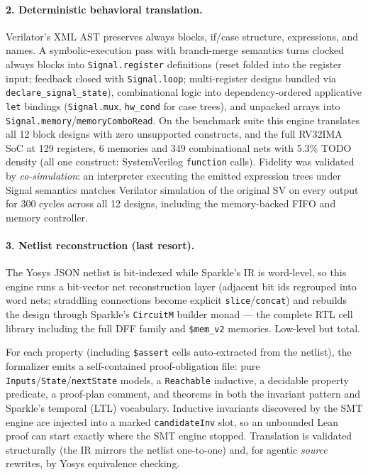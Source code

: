 \documentclass[11pt]{article}
\begin{document}
\paragraph{2. Deterministic behavioral translation.} Verilator's XML AST
preserves always blocks, if/case structure, expressions, and names. A
symbolic-execution pass with branch-merge semantics turns clocked always
blocks into \texttt{Signal.register} definitions (reset folded into the
register input; feedback closed with \texttt{Signal.loop}; multi-register
designs bundled via \texttt{declare\_signal\_state}), combinational logic
into dependency-ordered applicative \texttt{let} bindings
(\texttt{Signal.mux}, \texttt{hw\_cond} for case trees), and unpacked
arrays into \texttt{Signal.memory}/\texttt{memoryComboRead}. On the
benchmark suite this engine translates all 12 block designs with zero
unsupported constructs, and the full RV32IMA SoC at 129 registers, 6
memories and 349 combinational nets with 5.3\% TODO density (all one
construct: SystemVerilog \texttt{function} calls). Fidelity was validated
by \emph{co-simulation}: an interpreter executing the emitted expression
trees under Signal semantics matches Verilator simulation of the original
SV on every output for 300 cycles across all 12 designs, including the
memory-backed FIFO and memory controller.

\paragraph{3. Netlist reconstruction (last resort).} The Yosys JSON netlist
is bit-indexed while Sparkle's IR is word-level, so this engine runs a
bit-vector net reconstruction layer (adjacent bit ids regrouped into word
nets; straddling connections become explicit \texttt{slice}/\texttt{concat})
and rebuilds the design through Sparkle's \texttt{CircuitM} builder monad
--- the complete RTL cell library including the full DFF family and
\texttt{\$mem\_v2} memories. Low-level but total.

For each property (including \texttt{\$assert} cells auto-extracted from the
netlist), the formalizer emits a self-contained proof-obligation file: pure
\texttt{Inputs}/\texttt{State}/\texttt{nextState} models, a
\texttt{Reachable} inductive, a decidable property predicate, a proof-plan
comment, and theorems in both the invariant pattern and Sparkle's temporal
(LTL) vocabulary. Inductive invariants discovered by the SMT engine are
injected into a marked \texttt{candidateInv} slot, so an unbounded Lean
proof can start exactly where the SMT engine stopped. Translation is
validated structurally (the IR mirrors the netlist one-to-one) and, for
agentic \emph{source} rewrites, by Yosys equivalence checking.
\end{document}
